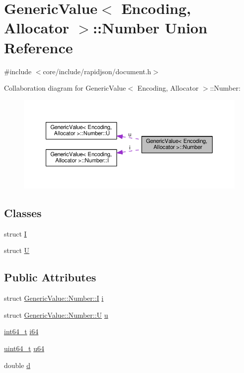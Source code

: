 \hypertarget{unionGenericValue_1_1Number}{}\section{Generic\+Value$<$ Encoding, Allocator $>$\+:\+:Number Union Reference}
\label{unionGenericValue_1_1Number}


{\ttfamily \#include $<$core/include/rapidjson/document.\+h$>$}



Collaboration diagram for Generic\+Value$<$ Encoding, Allocator $>$\+:\+:Number\+:
\nopagebreak
\begin{figure}[H]
\begin{center}
\leavevmode
\includegraphics[width=350pt]{unionGenericValue_1_1Number__coll__graph}
\end{center}
\end{figure}
\subsection*{Classes}
\begin{DoxyCompactItemize}
\item 
struct \hyperlink{structGenericValue_1_1Number_1_1I}{I}
\item 
struct \hyperlink{structGenericValue_1_1Number_1_1U}{U}
\end{DoxyCompactItemize}
\subsection*{Public Attributes}
\begin{DoxyCompactItemize}
\item 
struct \hyperlink{structGenericValue_1_1Number_1_1I}{Generic\+Value\+::\+Number\+::I} \hyperlink{unionGenericValue_1_1Number_a0593fffc72a240979606668179e94436}{i}
\item 
struct \hyperlink{structGenericValue_1_1Number_1_1U}{Generic\+Value\+::\+Number\+::U} \hyperlink{unionGenericValue_1_1Number_a3b5f0986718c830b88d641491248131d}{u}
\item 
\hyperlink{stdint_8h_a414156feea104f8f75b4ed9e3121b2f6}{int64\+\_\+t} \hyperlink{unionGenericValue_1_1Number_ae53d96a8ead92099541da3b71633b77b}{i64}
\item 
\hyperlink{stdint_8h_aec6fcb673ff035718c238c8c9d544c47}{uint64\+\_\+t} \hyperlink{unionGenericValue_1_1Number_a1c8d3c6d226cf74315e233b30b622430}{u64}
\item 
double \hyperlink{unionGenericValue_1_1Number_a7ca3ad492fff303586d241eb0d17c242}{d}
\end{DoxyCompactItemize}


